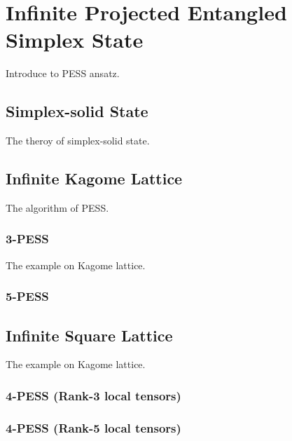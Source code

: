 \chapter{Infinite Projected Entangled Simplex State}
\label{chapter:ipess}
Introduce to PESS ansatz.

\section{Simplex-solid State}
\label{solidstate}
The theroy of simplex-solid state.

\section{Infinite Kagome Lattice}
The algorithm of PESS.
\subsection{3-PESS}
The example on Kagome lattice.
\label{3pess}

\subsection{5-PESS}
\label{5pess}

\section{Infinite Square Lattice}
The example on Kagome lattice.
\subsection{4-PESS (Rank-3 local tensors)}
\label{4pess2b}

\subsection{4-PESS (Rank-5 local tensors)}
\label{4pess4b}

